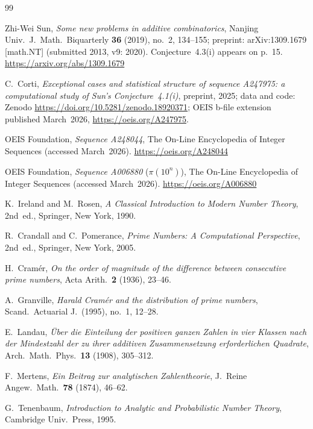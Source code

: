 \documentclass{amsart}
\theoremstyle{definition}
\theoremstyle{remark}
\numberwithin{equation}{section}
\begin{document}

\begin{thebibliography}{99}

Zhi-Wei Sun,
\textit{Some new problems in additive combinatorics},
Nanjing Univ.\ J.\ Math.\ Biquarterly \textbf{36} (2019), no.~2,
134--155; preprint: arXiv:1309.1679 [math.NT] (submitted 2013,
v9: 2020).
Conjecture~4.3(i) appears on p.~15.
\url{https://arxiv.org/abs/1309.1679}

C.~Corti,
\textit{Exceptional cases and statistical structure of sequence
A247975: a computational study of Sun's Conjecture~4.1(i)},
preprint, 2025; data and code: Zenodo
\url{https://doi.org/10.5281/zenodo.18920371};
OEIS b-file extension published March~2026,
\url{https://oeis.org/A247975}.

OEIS Foundation,
\textit{Sequence A248044},
The On-Line Encyclopedia of Integer Sequences
(accessed March~2026).
\url{https://oeis.org/A248044}

OEIS Foundation,
\textit{Sequence A006880} ($\pi(10^n)$),
The On-Line Encyclopedia of Integer Sequences
(accessed March~2026).
\url{https://oeis.org/A006880}

K.~Ireland and M.~Rosen,
\textit{A Classical Introduction to Modern Number Theory},
2nd~ed., Springer, New York, 1990.

R.~Crandall and C.~Pomerance,
\textit{Prime Numbers: A Computational Perspective},
2nd~ed., Springer, New York, 2005.

H.~Cram\'er,
\textit{On the order of magnitude of the difference between
consecutive prime numbers},
Acta Arith.\ \textbf{2} (1936), 23--46.

A.~Granville,
\textit{Harald Cram\'er and the distribution of prime numbers},
Scand.\ Actuarial J.\ (1995), no.~1, 12--28.

E.~Landau,
\textit{\"Uber die Einteilung der positiven ganzen Zahlen in vier
Klassen nach der Mindestzahl der zu ihrer additiven Zusammensetzung
erforderlichen Quadrate},
Arch.\ Math.\ Phys.\ \textbf{13} (1908), 305--312.

F.~Mertens,
\textit{Ein Beitrag zur analytischen Zahlentheorie},
J.\ Reine Angew.\ Math.\ \textbf{78} (1874), 46--62.

G.~Tenenbaum,
\textit{Introduction to Analytic and Probabilistic Number Theory},
Cambridge Univ.\ Press, 1995.


\end{thebibliography}
\end{document}
